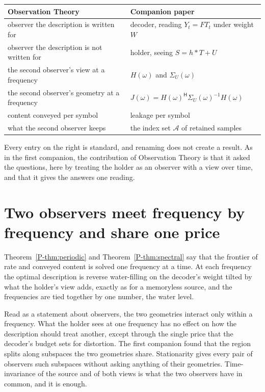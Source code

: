 \documentclass[11pt]{article}
\newcommand{\Th}[1]{Theorem~\ref{P-#1}}
\begin{document}
\begin{center}
\begin{tabular}{>{\raggedright\arraybackslash}p{7.2cm}>{\raggedright\arraybackslash}p{7.2cm}}
\hline
Observation Theory & Companion paper \\
\hline
observer the description is written for & decoder, reading $Y_t=FT_t$ under weight $W$ \\
observer the description is not written for & holder, seeing $S=h\ast T+U$ \\
the second observer's view at a frequency & $H(\omega)$ and $\Sigma_U(\omega)$ \\
the second observer's geometry at a frequency & $J(\omega)=H(\omega)^{\mathsf H}\Sigma_U(\omega)^{-1}H(\omega)$ \\
content conveyed per symbol & leakage per symbol \\
what the second observer keeps & the index set $\mathcal A$ of retained samples \\
\hline
\end{tabular}
\end{center}

Every entry on the right is standard, and renaming does not create a
result. As in the first companion, the contribution of Observation
Theory is that it asked the questions, here by treating the holder as an
observer with a view over time, and that it gives the answers one
reading.

\section{Two observers meet frequency by frequency and share one price}
\label{sec:price}

\Th{thm:periodic} and \Th{thm:spectral} say that the frontier of rate
and conveyed content is solved one frequency at a time. At each
frequency the optimal description is reverse water-filling on the
decoder's weight tilted by what the holder's view adds, exactly as for
a memoryless source, and the frequencies are tied together by one
number, the water level.

Read as a statement about observers, the two geometries interact only
within a frequency. What the holder sees at one frequency has no effect
on how the description should treat another, except through the single
price that the decoder's budget sets for distortion. The first
companion found that the region splits along subspaces the two
geometries share. Stationarity gives every pair of observers such
subspaces without asking anything of their geometries. Time-invariance
of the source and of both views is what the two observers have in
common, and it is enough.
\end{document}

